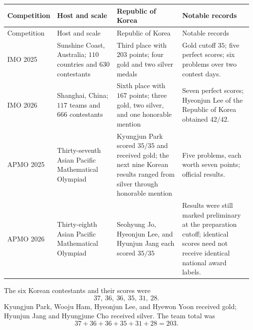     {\small
    \renewcommand{\arraystretch}{1.2}
    \begin{longtable}{@{}L{0.12\textwidth}L{0.21\textwidth}L{0.27\textwidth}L{0.32\textwidth}@{}}
        \toprule
        Competition & Host and scale & Republic of Korea & Notable records \\
        \midrule
        \endfirsthead

        \toprule
        Competition & Host and scale & Republic of Korea & Notable records \\
        \midrule
        \endhead

        \bottomrule
        \endlastfoot

        IMO 2025
        & Sunshine Coast, Australia; $110$ countries and $630$ contestants
        & Third place with $203$ points; four gold and two silver medals
        & Gold cutoff $35$; five perfect scores; six problems over two contest days. \\

        IMO 2026
        & Shanghai, China; $117$ teams and $666$ contestants
        & Sixth place with $167$ points; three gold, two silver, and one
          honorable mention
        & Seven perfect scores; Hyeonjun Lee of the Republic of Korea obtained $42/42$. \\

        APMO 2025
        & Thirty-seventh Asian Pacific Mathematical Olympiad
        & Kyungjun Park scored $35/35$ and received gold; the next nine Korean
          results ranged from silver through honorable mention
        & Five problems, each worth seven points; official results. \\

        APMO 2026
        & Thirty-eighth Asian Pacific Mathematical Olympiad
        & Seohyung Jo, Hyeonjun Lee, and Hyunjun Jang each scored $35/35$
        & Results were still marked preliminary at the preparation cutoff;
          identical scores need not receive identical national award labels. \\
    \end{longtable}
    }

    \begin{fact}
        The six Korean contestants and their scores were
        \[
            37,\ 36,\ 36,\ 35,\ 31,\ 28.
        \]
        Kyungjun Park, Wooju Ham, Hyeonjun Lee, and Hyewon Yoon received gold;
        Hyunjun Jang and Hyungjune Cho received silver. The team total was
        \[
            37+36+36+35+31+28=203.
        \]
    \end{fact}

